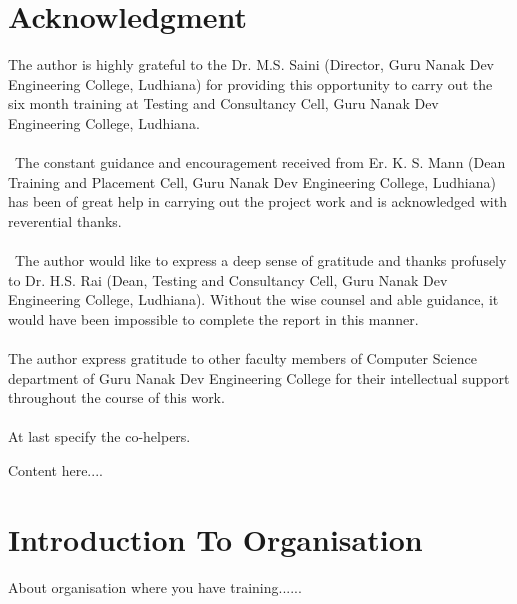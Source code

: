 \documentclass[12pt]{myclass}
\makeatletter
\renewenvironment{abstract}{%
  \titlepage
  \@beginparpenalty\@lowpenalty
  \begin{center}%
    \bfseries \abstractname
    \@endparpenalty\@M
  \end{center}%
}{
  \par\vfil\null\endtitlepage
}\makeatother
\makeatother
\begin{document}
\begin{print}
\section*{Acknowledgment}                           %
The author is highly grateful to the Dr. M.S. Saini (Director, Guru Nanak Dev Engineering College, Ludhiana) for providing this opportunity to carry out the six month training at Testing and Consultancy Cell, Guru Nanak Dev Engineering College, Ludhiana.\\ \\
 The constant guidance and encouragement received from Er. K. S. Mann (Dean Training and Placement Cell, Guru Nanak Dev Engineering
College, Ludhiana) has been of great help in carrying out the project work and is acknowledged with reverential thanks.\\ \\
 The author would like to express a deep sense of gratitude and thanks profusely to Dr. H.S. Rai (Dean, Testing and Consultancy Cell, Guru Nanak Dev Engineering College, Ludhiana). Without the wise counsel and able guidance, it would have been impossible to complete the report in this manner. \\ \\
The author express gratitude to other faculty members of Computer Science department of Guru Nanak Dev Engineering College for their intellectual support throughout the course of this work.\\ \\

At last specify the co-helpers.
\
\begin{abstract}
Content here....
\end{abstract}

\tableofcontents                       %

\listoffigures                         %



\cfoot{\thepage}                        %

\section{Introduction To Organisation}
About organisation where you have training......
\end{print}
\end{document}
